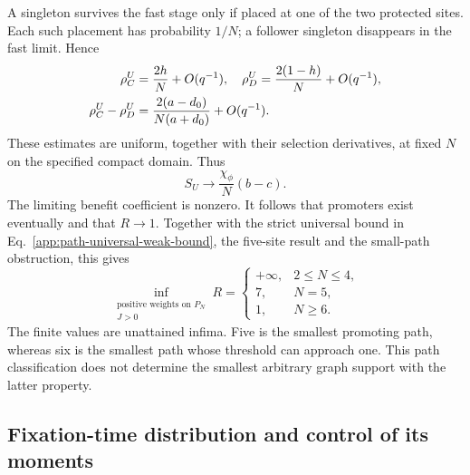\documentclass[aps,pre,reprint,amsmath,amssymb,longbibliography]{revtex4-2}
\begin{document}
A singleton survives the fast stage only if placed at one of the two
protected sites. Each such placement has probability $1/N$; a follower
singleton disappears in the fast limit. Hence
\begin{align}
 \rho_C^U&=\frac{2h}{N}+O(q^{-1}),\quad
 \rho_D^U=\frac{2(1-h)}{N}+O(q^{-1}),\notag\\
 \rho_C^U-\rho_D^U&=
 \frac{2(a-d_0)}{N(a+d_0)}+O(q^{-1}).
 \label{app:path-general-terminal-law}
\end{align}
These estimates are uniform, together with their selection derivatives,
at fixed $N$ on the specified compact domain. Thus
\begin{equation}
 S_U\longrightarrow\frac{\chi_\phi}{N}(b-c).
 \label{app:path-general-response}
\end{equation}
The limiting benefit coefficient is nonzero. It follows that promoters
exist eventually and that $R\to1$. Together with the strict universal
bound in Eq.~\eqref{app:path-universal-weak-bound}, the five-site result and
the small-path obstruction, this gives
\begin{equation}
 \inf_{\substack{\text{positive weights on }P_N\\J>0}}R=
 \begin{cases}
 +\infty,&2\leq N\leq4,\\
 7,&N=5,\\
 1,&N\geq6.
 \end{cases}
 \label{app:path-final-classification}
\end{equation}
The finite values are unattained infima. Five is the smallest promoting
path, whereas six is the smallest path whose threshold can approach one.
This path classification does not determine the smallest arbitrary graph support
with the latter property.

\subsection{Fixation-time distribution and control of its moments}
\label{app:path-general-times}
\end{document}
